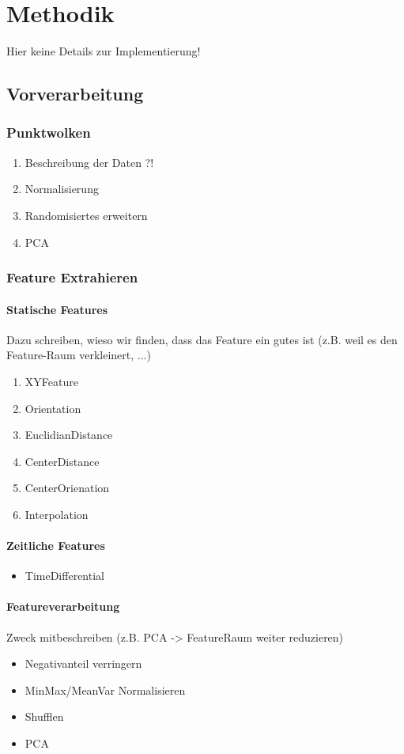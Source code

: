 \chapter{Methodik}
Hier keine Details zur Implementierung!
\section{Vorverarbeitung}
\subsection{Punktwolken}
\begin{enumerate}
  \item Beschreibung der Daten ?!
  \item Normalisierung
  \item Randomisiertes erweitern
  \item PCA
\end{enumerate}

\subsection{Feature Extrahieren}
\subsubsection{Statische Features}
Dazu schreiben, wieso wir finden, dass das Feature ein gutes ist (z.B. weil es den Feature-Raum verkleinert, ...)
\begin{enumerate}
  \item XYFeature
  \item Orientation
  \item EuclidianDistance
  \item CenterDistance
  \item CenterOrienation
  \item Interpolation
\end{enumerate}

\subsubsection{Zeitliche Features}
\begin{itemize}
\item TimeDifferential
\end{itemize}

\subsubsection{Featureverarbeitung}
Zweck mitbeschreiben (z.B. PCA -> FeatureRaum weiter reduzieren)
\begin{itemize}
  \item Negativanteil verringern
  \item MinMax/MeanVar Normalisieren
  \item Shufflen
  \item PCA
\end{itemize}
